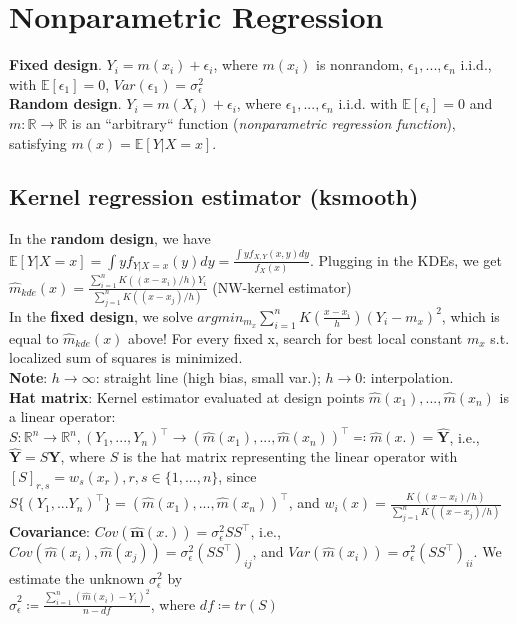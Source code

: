 \section{Nonparametric Regression}
\textbf{Fixed design}. $Y_i = m(x_i) + \epsilon_i$, where $m(x_i)$ is nonrandom, $\epsilon_1,...,\epsilon_n$ i.i.d., with $\mathbb{E}[\epsilon_1]=0$, $Var(\epsilon_1)=\sigma_{\epsilon}^2$\\
\textbf{Random design}. $Y_i = m(X_i) + \epsilon_i$, where $\epsilon_1,...,\epsilon_n$ i.i.d. with $\mathbb{E}[\epsilon_i]=0$ and $m:\mathbb{R}\to \mathbb{R}$ is an ``arbitrary`` function (\emph{nonparametric regression function}), satisfying $m(x) = \mathbb{E}[Y|X=x]$.

\subsection*{Kernel regression estimator (ksmooth)}
In the \textbf{random design}, we have \\ $\mathbb{E}[Y|X=x]=\int{yf_{Y|X=x}(y)dy} = \frac{\int{yf_{X,Y}(x,y)dy}}{f_X(x)}$. Plugging in the KDEs, we get $\hat{m}_{kde}(x)= \frac{\sum_{i=1}^n{K\left((x-x_i)/h\right)}Y_i} {{\sum_{j=1}^n K\left((x-x_j)/h\right)}}$ (NW-kernel estimator)\\ 
In the \textbf{fixed design}, we solve $argmin_{m_x}\sum_{i=1}^nK\left(\frac{x-x_i}{h}\right)\left(Y_i-m_x\right)^2$, which is equal to $\hat{m}_{kde}(x)$ above! \textrightarrow For every fixed x, search for best local constant $m_x$ s.t. localized sum of squares is minimized.\\
\textbf{Note}: $h \to \infty$: straight line (high bias, small var.); $h \to 0$: interpolation.\\
\textbf{Hat matrix}: Kernel estimator evaluated at design points $\hat{m}(x_1),...,\hat{m}(x_n)$ is a linear operator:\\ $S: \mathbb{R}^n \to \mathbb{R}^n, (Y_1,...,Y_n)^\intercal \to (\hat{m}(x_1),...,\hat{m}(x_n))^\intercal \eqqcolon \hat{m}(x.)=\hat{\mathbf{Y}}$, i.e., \\ 
$\hat{\mathbf{Y}}=S\mathbf{Y}$, where $S$ is the hat matrix representing the linear operator with $[S]_{r,s}=w_s(x_r), r,s \in \{1,...,n\}$, since $S\{(Y_1,...Y_n)^\intercal \}=(\hat{m}(x_1),...,\hat{m}(x_n))^\intercal $, and $w_i(x)=\frac{K((x-x_i)/h)}{\sum_{j=1}^nK((x-x_j)/h)}$\\
\textbf{Covariance}: $Cov(\hat{\mathbf{m}}(x.)) = \sigma_\epsilon^2 S S^\intercal $, i.e., $Cov(\hat{m}(x_i), \hat{m}(x_j)) = \sigma_\epsilon^2 (S S^\intercal )_{ij}$, and $Var(\hat{m}(x_i))=\sigma_\epsilon^2 (S S^\intercal )_{ii}$. We estimate the unknown $\sigma_\epsilon^2$ by \\ $\hat{\sigma}_\epsilon^2 \coloneqq \frac{\sum_{i=1}^n(\hat{m}(x_i)-Y_i)^2}{n-df}$, where $df \coloneqq tr(S)$ \\
